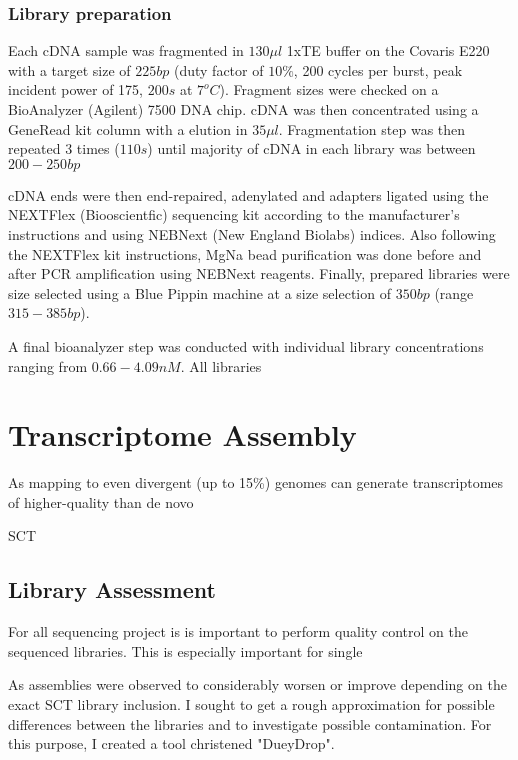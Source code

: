 \subsubsection{Library preparation}

Each cDNA sample was fragmented in \(130\mu l\) 1xTE buffer on the Covaris E220 
with a target size of \(225bp\) (duty factor of \(10\%\), 200 cycles per burst, peak incident power
of 175, \(200s\) at \(7^{o}C\)). Fragment sizes were checked on a BioAnalyzer (Agilent) 7500 DNA chip.
cDNA was then concentrated using a GeneRead kit column with a elution in \(35\mu l\). Fragmentation
step was then repeated 3 times (\(110s\)) until majority of cDNA in each library was between \(200-250bp\)

cDNA ends were then end-repaired, adenylated and adapters ligated using the NEXTFlex (Biooscientfic) sequencing kit 
according to the manufacturer's instructions and using NEBNext (New England Biolabs) indices.  Also following
the NEXTFlex kit instructions, MgNa bead purification was done before and after PCR amplification using
NEBNext reagents.  Finally, prepared libraries were size selected using a Blue Pippin machine at a size selection
of \(350bp\) (range \(315-385bp\)).

A final bioanalyzer step was conducted with individual library concentrations ranging from \(0.66-4.09nM\).
All libraries 


\section{Transcriptome Assembly}

As mapping to even divergent (up to 15\%) genomes can generate transcriptomes of higher-quality
than de novo \citep{Vijay2013}

SCT


\subsection{Library Assessment}

For all sequencing project is is important to perform quality control on the sequenced libraries.
This is especially important for single 


As assemblies were observed to considerably worsen or improve depending on the exact 
SCT library inclusion.  I sought to get a rough approximation for possible differences between
the libraries and to investigate possible contamination.  For this purpose, I created a tool
christened "DueyDrop".

